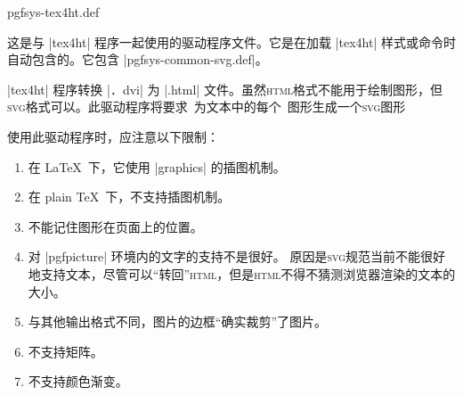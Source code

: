 \begin{filedescription}{pgfsys-tex4ht.def}

    这是与 |tex4ht| 程序一起使用的驱动程序文件。它是在加载 |tex4ht| 样式或命令时自动包含的。它包含 |pgfsys-common-svg.def|。


    |tex4ht| 程序转换 |．dvi| 为 |.html| 文件。虽然\textsc{html}格式不能用于绘制图形，但\textsc{svg}格式可以。此驱动程序将要求\pgfname\ 为文本中的每个\pgfname\ 图形生成一个\textsc{svg}图形


    使用此驱动程序时，应注意以下限制：
    \begin{enumerate}
        \item 在  \LaTeX\ 下，它使用 |graphics| 的插图机制。
        \item 在 plain \TeX\ 下，不支持插图机制。
        \item 不能记住图形在页面上的位置。
        \item 对 |pgfpicture| 环境内的文字的支持不是很好。 原因是\textsc{svg}规范当前不能很好地支持文本，尽管可以``转回''\textsc{html}，但是\textsc{html}不得不猜测浏览器渲染的文本的大小。
        \item 与其他输出格式不同，图片的边框``确实裁剪''了图片。
        \item 不支持矩阵。
        \item 不支持颜色渐变。
    \end{enumerate}


\end{filedescription}
